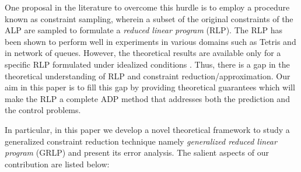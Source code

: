 One proposal in the literature to overcome this hurdle is to employ a procedure known as constraint sampling, wherein a subset of the original constraints of the ALP are sampled to formulate a \emph{reduced linear program} (RLP). The RLP has been shown to perform well in experiments \cite{ALP,CS,CST} in various domains such as Tetris and in network of queues. However, the theoretical results are available only for a specific RLP formulated under idealized conditions \cite{CS}. Thus, there is a gap in the theoretical understanding of RLP and constraint reduction/approximation. Our aim in this paper is to fill this gap by providing theoretical guarantees which will make the RLP a complete ADP method that addresses both the prediction and the control problems.

In particular, in this paper we develop a novel theoretical framework to study a generalized constraint reduction technique namely \emph{generalized reduced linear program} (GRLP) and present its error analysis. The salient aspects of our contribution are listed below:
